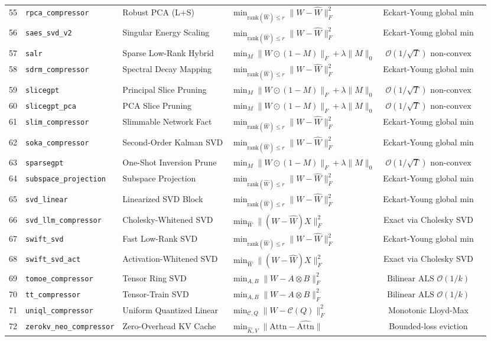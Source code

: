 \begin{center}
\begin{longtable}{rlllcc}
55 & \texttt{rpca\_compressor} & Robust PCA (L+S) & $\min_{\text{rank}(\hat{W})\le r} \|W - \hat{W}\|_F^2$ & Eckart-Young global min \\
56 & \texttt{saes\_svd\_v2} & Singular Energy Scaling & $\min_{\text{rank}(\hat{W})\le r} \|W - \hat{W}\|_F^2$ & Eckart-Young global min \\
57 & \texttt{salr} & Sparse Low-Rank Hybrid & $\min_M \|W \odot (1-M)\|_F + \lambda \|M\|_0$ & $\mathcal{O}(1/\sqrt{T}) \text{ non-convex}$ \\
58 & \texttt{sdrm\_compressor} & Spectral Decay Mapping & $\min_{\text{rank}(\hat{W})\le r} \|W - \hat{W}\|_F^2$ & Eckart-Young global min \\
59 & \texttt{slicegpt} & Principal Slice Pruning & $\min_M \|W \odot (1-M)\|_F + \lambda \|M\|_0$ & $\mathcal{O}(1/\sqrt{T}) \text{ non-convex}$ \\
60 & \texttt{slicegpt\_pca} & PCA Slice Pruning & $\min_M \|W \odot (1-M)\|_F + \lambda \|M\|_0$ & $\mathcal{O}(1/\sqrt{T}) \text{ non-convex}$ \\
61 & \texttt{slim\_compressor} & Slimmable Network Fact & $\min_{\text{rank}(\hat{W})\le r} \|W - \hat{W}\|_F^2$ & Eckart-Young global min \\
62 & \texttt{soka\_compressor} & Second-Order Kalman SVD & $\min_{\text{rank}(\hat{W})\le r} \|W - \hat{W}\|_F^2$ & Eckart-Young global min \\
63 & \texttt{sparsegpt} & One-Shot Inversion Prune & $\min_M \|W \odot (1-M)\|_F + \lambda \|M\|_0$ & $\mathcal{O}(1/\sqrt{T}) \text{ non-convex}$ \\
64 & \texttt{subspace\_projection} & Subspace Projection & $\min_{\text{rank}(\hat{W})\le r} \|W - \hat{W}\|_F^2$ & Eckart-Young global min \\
65 & \texttt{svd\_linear} & Linearized SVD Block & $\min_{\text{rank}(\hat{W})\le r} \|W - \hat{W}\|_F^2$ & Eckart-Young global min \\
66 & \texttt{svd\_llm\_compressor} & Cholesky-Whitened SVD & $\min_{\hat{W}} \|(W - \hat{W}) X\|_F^2$ & Exact via Cholesky SVD \\
67 & \texttt{swift\_svd} & Fast Low-Rank SVD & $\min_{\text{rank}(\hat{W})\le r} \|W - \hat{W}\|_F^2$ & Eckart-Young global min \\
68 & \texttt{swift\_svd\_act} & Activation-Whitened SVD & $\min_{\hat{W}} \|(W - \hat{W}) X\|_F^2$ & Exact via Cholesky SVD \\
69 & \texttt{tomoe\_compressor} & Tensor Ring SVD & $\min_{A, B} \|W - A \otimes B\|_F^2$ & $\text{Bilinear ALS } \mathcal{O}(1/k)$ \\
70 & \texttt{tt\_compressor} & Tensor-Train SVD & $\min_{A, B} \|W - A \otimes B\|_F^2$ & $\text{Bilinear ALS } \mathcal{O}(1/k)$ \\
71 & \texttt{uniql\_compressor} & Uniform Quantized Linear & $\min_{\mathcal{C}, Q} \|W - \mathcal{C}(Q)\|_F^2$ & Monotonic Lloyd-Max \\
72 & \texttt{zerokv\_neo\_compressor} & Zero-Overhead KV Cache & $\min_{\hat{K},\hat{V}} \|\text{Attn} - \hat{\text{Attn}}\|$ & Bounded-loss eviction \\
\end{longtable}
\end{center}

